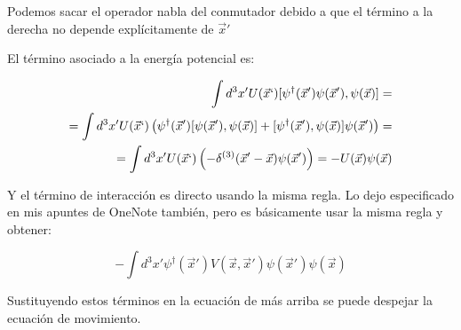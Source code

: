\documentclass{article} %
\begin{document}
Podemos sacar el operador nabla del conmutador debido a que el término a la derecha no depende explícitamente de $\vec{x}'$

El término asociado a la energía potencial es:

\begin{align*}
\int d^3x' U(\vec{x}`)[\psi^{\dagger} (\vec{x}')\psi (\vec{x}'), \psi(\vec{x})] = \\ = \int d^3x' U(\vec{x}`) \left( \psi^{\dagger} (\vec{x}') [\psi (\vec{x}'), \psi(\vec{x})] + [\psi^{\dagger} (\vec{x}'), \psi(\vec{x})] \psi (\vec{x}') \right) = \\ = \int d^3x' U(\vec{x}`) \left( -\delta^{(3)}(\vec{x}' - \vec{x})  \psi (\vec{x}') \right) = -U(\vec{x}) \psi(\vec{x})
\end{align*}

Y el término de interacción es directo usando la misma regla. Lo dejo especificado en mis apuntes de OneNote también, pero es básicamente usar la misma regla y obtener:

$$
-\int d^3 x' \psi^{\dagger} (\vec{x}') V(\vec{x}, \vec{x}') \psi(\vec{x}') \psi(\vec{x})
$$

Sustituyendo estos términos en la ecuación de más arriba se puede despejar la ecuación de movimiento.

\printbibliography
\end{document}
